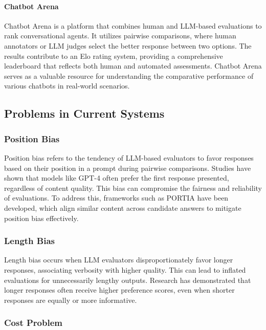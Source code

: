 \documentclass[sigconf, authoryear]{acmart}
\begin{document}
\paragraph{Chatbot Arena}


Chatbot Arena is a platform that combines human and LLM-based evaluations to rank conversational agents.
It utilizes pairwise comparisons, where human annotators or LLM judges select the better response between two options.
The results contribute to an Elo rating system, providing a comprehensive leaderboard that reflects both human and automated assessments.
Chatbot Arena serves as a valuable resource for understanding the comparative performance of various chatbots in real-world scenarios\cite{mtbench}.

\subsection{Problems in Current Systems}\label{subsec:problems-in-current-systems}

\subsubsection{Position Bias}

Position bias refers to the tendency of LLM-based evaluators to favor responses based on their position in a prompt during pairwise comparisons.
Studies have shown that models like GPT-4 often prefer the first response presented, regardless of content quality\cite{shi2024judging}.
This bias can compromise the fairness and reliability of evaluations.
To address this, frameworks such as PORTIA have been developed, which align similar content across candidate answers to mitigate position bias effectively\cite{li-etal-2024-split}.

\subsubsection{Length Bias}

Length bias occurs when LLM evaluators disproportionately favor longer responses, associating verbosity with higher quality.
This can lead to inflated evaluations for unnecessarily lengthy outputs.
Research has demonstrated that longer responses often receive higher preference scores, even when shorter responses are equally or more informative\cite{hu2024explaining}.

\subsubsection{Cost Problem}
\end{document}
